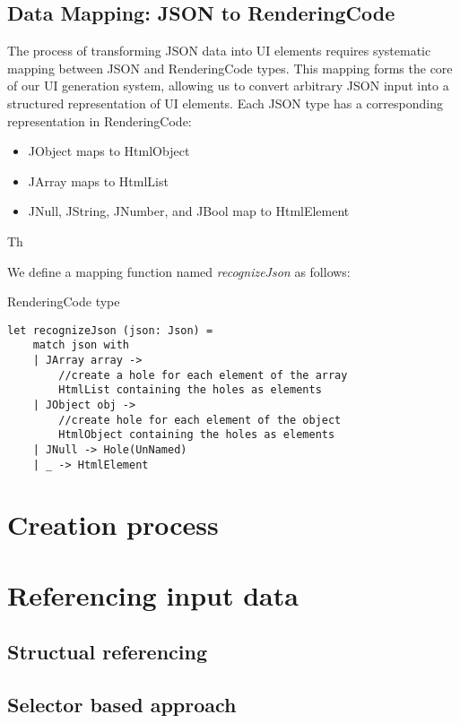 \subsection{Data Mapping: JSON to RenderingCode}
The process of transforming JSON data into UI elements requires systematic mapping between JSON and RenderingCode types.
This mapping forms the core of our UI generation system, allowing us to convert arbitrary JSON input into a structured representation of UI elements.
Each JSON type has a corresponding representation in RenderingCode:
\begin{itemize}
	\item JObject maps to HtmlObject
	\item JArray maps to HtmlList
	\item JNull, JString, JNumber, and JBool map to HtmlElement
\end{itemize}
Th

We define a mapping function named \emph{recognizeJson} as follows:
\begin{listing}[H]
	\caption {RenderingCode type}
	\begin{lstlisting}
let recognizeJson (json: Json) =
    match json with
    | JArray array -> 
        //create a hole for each element of the array
        HtmlList containing the holes as elements
    | JObject obj ->
        //create hole for each element of the object 
        HtmlObject containing the holes as elements
    | JNull -> Hole(UnNamed)
    | _ -> HtmlElement 
  \end{lstlisting}
\end{listing}


\section{Creation process}



\section{Referencing input data}
\subsection{Structual referencing}
\subsection{Selector based approach}

